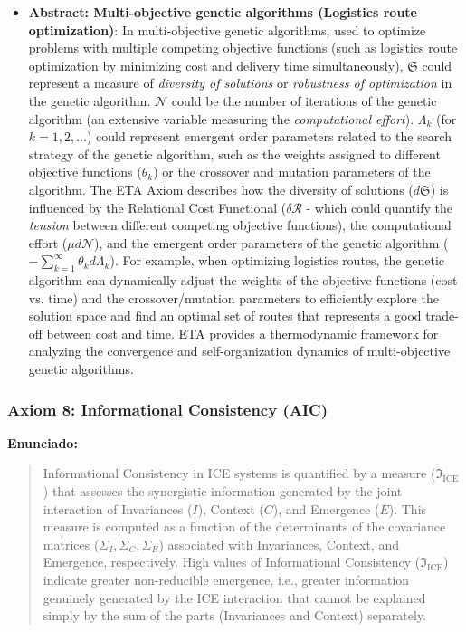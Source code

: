\documentclass{article}
\begin{document}
\begin{itemize}
\item \textbf{Abstract: Multi-objective genetic algorithms (Logistics route optimization)}: In multi-objective genetic algorithms, used to optimize problems with multiple competing objective functions (such as logistics route optimization by minimizing cost and delivery time simultaneously), $\mathfrak{S}$ could represent a measure of \emph{diversity of solutions} or \emph{robustness of optimization} in the genetic algorithm. $\mathcal{N}$ could be the number of iterations of the genetic algorithm (an extensive variable measuring the \textit{computational effort}). $\Lambda_k$ (for $k=1, 2, \ldots$) could represent emergent order parameters related to the search strategy of the genetic algorithm, such as the weights assigned to different objective functions ($\theta_k$) or the crossover and mutation parameters of the algorithm. The ETA Axiom describes how the diversity of solutions ($d\mathfrak{S}$) is influenced by the Relational Cost Functional ($\delta\mathcal{R}$ - which could quantify the \textit{tension} between different competing objective functions), the computational effort ($\mu d\mathcal{N}$), and the emergent order parameters of the genetic algorithm ($-\sum_{k=1}^\infty \theta_k d\Lambda_k$). For example, when optimizing logistics routes, the genetic algorithm can dynamically adjust the weights of the objective functions (cost vs. time) and the crossover/mutation parameters to efficiently explore the solution space and find an optimal set of routes that represents a good trade-off between cost and time. ETA provides a thermodynamic framework for analyzing the convergence and self-organization dynamics of multi-objective genetic algorithms.
\end{itemize}


\subsubsection{Axiom 8: Informational Consistency (AIC)}
\label{ax:consistencia}

\textbf{Enunciado:}
\begin{quote}
    Informational Consistency in ICE systems is quantified by a measure ($\mathfrak{I}_\text{ICE}$) that assesses the synergistic information generated by the joint interaction of Invariances ($I$), Context ($C$), and Emergence ($E$). This measure is computed as a function of the determinants of the covariance matrices ($\Sigma_I, \Sigma_C, \Sigma_E$) associated with Invariances, Context, and Emergence, respectively. High values of Informational Consistency ($\mathfrak{I}_\text{ICE}$) indicate greater non-reducible emergence, i.e., greater information genuinely generated by the ICE interaction that cannot be explained simply by the sum of the parts (Invariances and Context) separately.
\end{quote}
\end{document}
